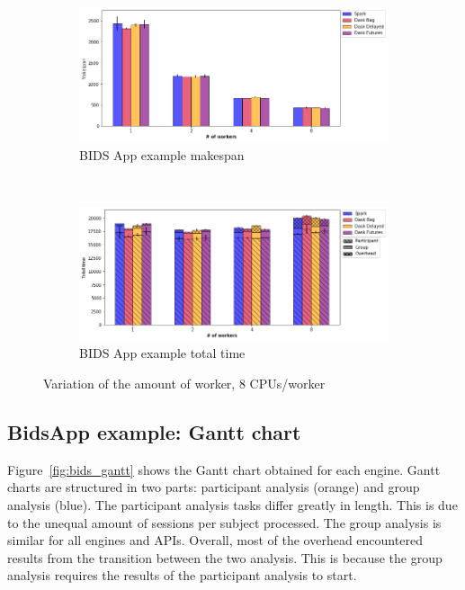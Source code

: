 \documentclass[conference]{IEEEtran}
\begin{document}


\begin{figure}[!t]
    \centering
    \begin{subfigure}[b]{\columnwidth}
        \includegraphics[clip,width=\columnwidth]{images/bids_worker.png}%
        \caption{BIDS App example makespan}\label{fig:bids_ms_worker}
    \end{subfigure}
    \\
    \begin{subfigure}[b]{\columnwidth}
        \includegraphics[clip,width=\columnwidth]{images/bids_idle_worker.png}%
        \caption{BIDS App example total time}\label{fig:bids_tt_worker}
    \end{subfigure}
    \caption{Variation of the amount of worker, 8 CPUs/worker}
\end{figure}


\subsection{BidsApp example: Gantt chart}
Figure~\ref{fig:bids_gantt} shows the Gantt chart obtained for each engine.
Gantt charts are structured in two parts: participant analysis (orange) and
group analysis (blue). The participant analysis tasks differ greatly in length. This
is due to the unequal amount of sessions per subject processed. The group analysis
is similar for all engines and APIs. Overall, most of the overhead encountered
results from the transition between the two analysis. This is because the group
analysis requires the results of the participant analysis to start.
\end{document}
